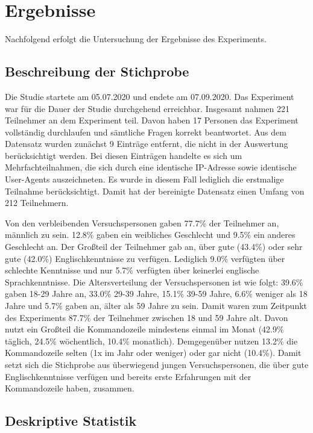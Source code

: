 \section{Ergebnisse}
Nachfolgend erfolgt die Untersuchung der Ergebnisse des Experiments.

\subsection{Beschreibung der Stichprobe}\label{beschreibung}
Die Studie startete am 05.07.2020 und endete am 07.09.2020. Das Experiment war für die Dauer der Studie durchgehend erreichbar. Insgesamt nahmen 221 Teilnehmer an dem Experiment teil. Davon haben 17 Personen das Experiment vollständig durchlaufen und sämtliche Fragen korrekt beantwortet. Aus dem Datensatz wurden zunächst 9 Einträge entfernt, die nicht in der Auswertung berücksichtigt werden. Bei diesen Einträgen handelte es sich um Mehrfachteilnahmen, die sich durch eine identische IP-Adresse sowie identische User-Agents auszeichneten. Es wurde in diesem Fall lediglich die erstmalige Teilnahme berücksichtigt. Damit hat der bereinigte Datensatz einen Umfang von 212 Teilnehmern.

Von den verbleibenden Versuchspersonen gaben 77.7\% der Teilnehmer an, männlich zu sein. 12.8\% gaben ein weibliches Geschlecht und 9.5\% ein anderes Geschlecht an. Der Großteil der Teilnehmer gab an, über gute (43.4\%) oder sehr gute (42.0\%) Englischkenntnisse zu verfügen. Lediglich 9.0\% verfügten über schlechte Kenntnisse und nur 5.7\% verfügten über keinerlei englische Sprachkenntnisse. Die Altersverteilung der Versuchspersonen ist wie folgt: 39.6\% gaben 18-29 Jahre an, 33.0\%  29-39 Jahre,  15.1\% 39-59 Jahre, 6.6\% weniger als 18 Jahre und 5.7\% gaben an, älter als 59 Jahre zu sein. Damit waren zum Zeitpunkt des Experiments 87.7\% der Teilnehmer zwischen 18 und 59 Jahre alt. Davon nutzt ein Großteil die Kommandozeile mindestens einmal im Monat (42.9\% täglich, 24.5\% wöchentlich, 10.4\% monatlich). Demgegenüber nutzen 13.2\% die Kommandozeile selten (1x im Jahr oder weniger) oder gar nicht (10.4\%). Damit setzt sich die Stichprobe aus überwiegend jungen Versuchspersonen, die über gute Englischkenntnisse verfügen und bereits erste Erfahrungen mit der Kommandozeile haben, zusammen.

\subsection{Deskriptive Statistik}

